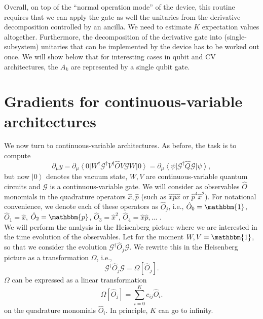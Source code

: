 \documentclass[aps,pra,10pt,twocolumn,groupedaddress,nofootinbib]{revtex4-1}
\theoremstyle{plain}
\newcommand{\ket}[1]{\ensuremath{\left| #1 \right \rangle}}
\newcommand{\bra}[1]{\ensuremath{\left \langle #1 \right |}}
\newcommand{\x}{\hat{x}}
\newcommand{\p}{\hat{p}}
\newcommand{\G}{\mathcal{G}}
\begin{document}
Overall, on top of the ``normal operation mode'' of the device, this routine requires that we can apply the gate as well the unitaries from the derivative decomposition controlled by an ancilla. We need to estimate $K$ expectation values altogether. Furthermore, the decomposition of the derivative gate into (single-subsystem)  unitaries that can be implemented by the device has to be worked out once. We will show below that for interesting cases in qubit and CV architectures, the $A_k$ are represented by a single qubit gate.


\section{Gradients for continuous-variable architectures}

We now turn to continuous-variable architectures. As before, the task is to compute 
\[\partial_{\mu}y = \partial_{\mu} \bra{0}W^{\dagger} \G^{\dagger} V^{\dagger} \hat{O}V \G W \ket{0} = \partial_{\mu} \bra{\psi} \G^{\dagger} \hat{Q} \G \ket{\psi},  \]
but now  $\ket{0}$ denotes the vacuum state, $W, V$ are continuous-variable quantum circuits and $\G$ is a continuous-variable gate. We will consider as observables $\hat{O}$ monomials in the quadrature operators $\x, \p$ (such as $\x \p \x$ or $\p^4 \x^2$). For notational convenience, we denote each of these operators as $\hat{O}_j$, i.e., $\hat{O}_0 = \mathbbm{1}$, $\hat{O}_1 = \x$, $\hat{O}_2 = \mathbbm{p}$, $\hat{O}_3 = \x^2$, $\hat{O}_4 = \x \p,...$ .\\

We will perform the analysis in the Heisenberg picture where we are interested in the time  evolution of the observables. Let for the moment $W,V=\mathbbm{1}$, so that we consider the evolution $\G^{\dagger} \hat{O}_j \G$. We rewrite this in the Heisenberg picture as a transformation $\Omega$, i.e.,
\begin{equation}
 \mathcal{G}^\dagger \hat{O}_j \mathcal{G} = \Omega[\hat{O}_j].
\end{equation}
$\Omega$ can be expressed as a linear transformation
\begin{equation}
 \Omega[\hat{O}_j] = \sum_{i=0}^{K} c_{ij} \hat{O}_i.
\end{equation}
on the quadrature monomials $\hat{O}_i$. In principle, $K$ can go to infinity.
 
\end{document}
